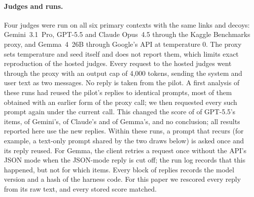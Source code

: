 \paragraph{Judges and runs.}
Four judges were run on all six primary contexts with the same links and decoys: Gemini~3.1~Pro, GPT-5.5 and Claude
Opus~4.5 through the Kaggle Benchmarks proxy, and Gemma~4~26B through Google's API at temperature 0. The proxy sets
temperature and seed itself and does not report them, which limits exact reproduction of the hosted judges. Every
request to the hosted judges went through the proxy with an output cap of 4,000 tokens, sending the system and user
text as two messages. No reply is taken from the pilot. A first analysis of these runs had reused the pilot's replies
to identical prompts, most of them obtained with an earlier form of the proxy call; we then requested every such prompt
again under the current call. This changed the score of \EGPTReaskChanged{} of GPT-5.5's \EGPTReaskItems{} items,
\EGeminiReaskChanged{} of Gemini's, \EOpusReaskChanged{} of Claude's and \EGemmaReaskChanged{} of Gemma's, and no
conclusion; all results reported here use the new replies. Within these runs, a prompt that recurs (for example, a
text-only prompt shared by the two draws below) is asked once and its reply reused. For Gemma, the client retries a request once without the API's JSON mode when the
JSON-mode reply is cut off; the run log records that this happened, but not for which items. Every block of replies
records the model version and a hash of the harness code. For this paper we rescored every reply from its raw text, and
every stored score matched.

